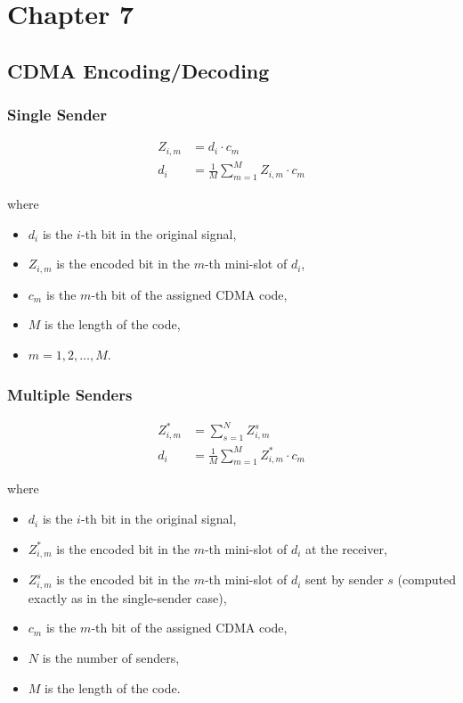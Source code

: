 \section{Chapter 7}

\subsection{CDMA Encoding/Decoding}

\subsubsection{Single Sender}

\begin{align*}
    Z_{i, m} & = d_i \cdot c_m \tag{encoding}                                   \\
    d_i      & = \frac{1}{M} \sum_{m=1}^{M} Z_{i, m} \cdot c_{m} \tag{decoding}
\end{align*}

where
\begin{itemize}
    \item $d_i$ is the $i$-th bit in the original signal,
    \item $Z_{i, m}$ is the encoded bit in the $m$-th mini-slot of $d_i$,
    \item $c_{m}$ is the $m$-th bit of the assigned CDMA code,
    \item $M$ is the length of the code,
    \item $m = 1, 2, \dots, M$.
\end{itemize}

\subsubsection{Multiple Senders}

\begin{align*}
    Z^*_{i, m} & = \sum_{s=1}^{N} Z^s_{i, m} \tag{encoding}                       \\
    d_i        & = \frac{1}{M} \sum_{m=1}^{M} Z^*_{i, m} \cdot c_m \tag{decoding}
\end{align*}

where
\begin{itemize}
    \item $d_i$ is the $i$-th bit in the original signal,
    \item $Z^*_{i, m}$ is the encoded bit in the $m$-th mini-slot of $d_i$ at the receiver,
    \item $Z^s_{i, m}$ is the encoded bit in the $m$-th mini-slot of $d_i$ sent by sender $s$ (computed exactly as in the single-sender case),
    \item $c_m$ is the $m$-th bit of the assigned CDMA code,
    \item $N$ is the number of senders,
    \item $M$ is the length of the code.
\end{itemize}

